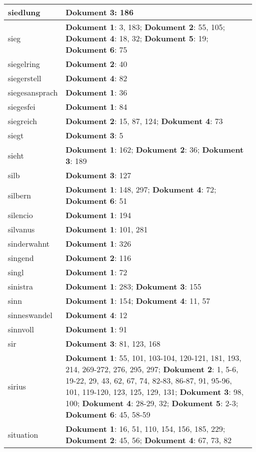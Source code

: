 \documentclass[a5paper]{article}
\begin{document}
\begin{longtable}[l]{|l|p{3in}|}
\hline
siedlung & \textbf{Dokument 3}: 186 \\
\hline
sieg & \textbf{Dokument 1}: 3, 183; \textbf{Dokument 2}: 55, 105; \textbf{Dokument 4}: 18, 32; \textbf{Dokument 5}: 19; \textbf{Dokument 6}: 75 \\
\hline
siegelring & \textbf{Dokument 2}: 40 \\
\hline
siegerstell & \textbf{Dokument 4}: 82 \\
\hline
siegesansprach & \textbf{Dokument 1}: 36 \\
\hline
siegesfei & \textbf{Dokument 1}: 84 \\
\hline
siegreich & \textbf{Dokument 2}: 15, 87, 124; \textbf{Dokument 4}: 73 \\
\hline
siegt & \textbf{Dokument 3}: 5 \\
\hline
sieht & \textbf{Dokument 1}: 162; \textbf{Dokument 2}: 36; \textbf{Dokument 3}: 189 \\
\hline
silb & \textbf{Dokument 3}: 127 \\
\hline
silbern & \textbf{Dokument 1}: 148, 297; \textbf{Dokument 4}: 72; \textbf{Dokument 6}: 51 \\
\hline
silencio & \textbf{Dokument 1}: 194 \\
\hline
silvanus & \textbf{Dokument 1}: 101, 281 \\
\hline
sinderwahnt & \textbf{Dokument 1}: 326 \\
\hline
singend & \textbf{Dokument 2}: 116 \\
\hline
singl & \textbf{Dokument 1}: 72 \\
\hline
sinistra & \textbf{Dokument 1}: 283; \textbf{Dokument 3}: 155 \\
\hline
sinn & \textbf{Dokument 1}: 154; \textbf{Dokument 4}: 11, 57 \\
\hline
sinneswandel & \textbf{Dokument 4}: 12 \\
\hline
sinnvoll & \textbf{Dokument 1}: 91 \\
\hline
sir & \textbf{Dokument 3}: 81, 123, 168 \\
\hline
sirius & \textbf{Dokument 1}: 55, 101, 103-104, 120-121, 181, 193, 214, 269-272, 276, 295, 297; \textbf{Dokument 2}: 1, 5-6, 19-22, 29, 43, 62, 67, 74, 82-83, 86-87, 91, 95-96, 101, 119-120, 123, 125, 129, 131; \textbf{Dokument 3}: 98, 100; \textbf{Dokument 4}: 28-29, 32; \textbf{Dokument 5}: 2-3; \textbf{Dokument 6}: 45, 58-59 \\
\hline
situation & \textbf{Dokument 1}: 16, 51, 110, 154, 156, 185, 229; \textbf{Dokument 2}: 45, 56; \textbf{Dokument 4}: 67, 73, 82 \\

\end{longtable}
\end{document}
